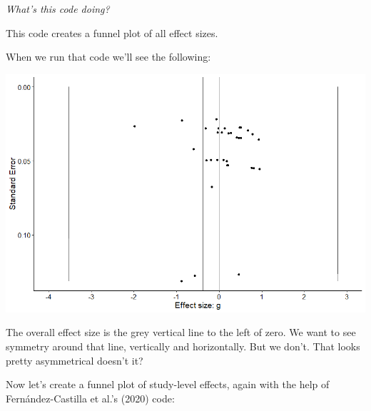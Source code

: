 \documentclass[
]{book}
\begin{document}
\emph{What's this code doing?}

This code creates a funnel plot of all effect sizes.

When we run that code we'll see the following:

\includegraphics[width=1\textwidth,height=\textheight]{images/funnel_all.png}

The overall effect size is the grey vertical line to the left of zero. We want to see symmetry around that line, vertically and horizontally. But we don't. That looks pretty asymmetrical doesn't it?

Now let's create a funnel plot of study-level effects, again with the help of Fernández-Castilla et al.'s (2020)\citep{fernández-castilla2020} code:
\end{document}
